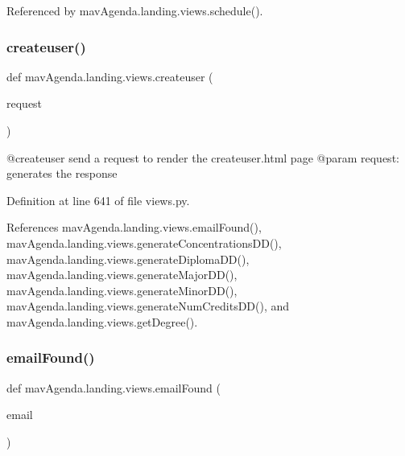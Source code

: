 Referenced by mav\+Agenda.\+landing.\+views.\+schedule().

\mbox{\label{namespacemavAgenda_1_1landing_1_1views_aa998c2a3a45470fbe34a8d653246f471}} 
\subsubsection{\texorpdfstring{createuser()}{createuser()}}
{\footnotesize\ttfamily def mav\+Agenda.\+landing.\+views.\+createuser (\begin{DoxyParamCaption}\item[{}]{request }\end{DoxyParamCaption})}

\begin{DoxyVerb}@createuser send a request to render the createuser.html page
@param request: generates the response
\end{DoxyVerb}
 

Definition at line 641 of file views.\+py.



References mav\+Agenda.\+landing.\+views.\+email\+Found(), mav\+Agenda.\+landing.\+views.\+generate\+Concentrations\+D\+D(), mav\+Agenda.\+landing.\+views.\+generate\+Diploma\+D\+D(), mav\+Agenda.\+landing.\+views.\+generate\+Major\+D\+D(), mav\+Agenda.\+landing.\+views.\+generate\+Minor\+D\+D(), mav\+Agenda.\+landing.\+views.\+generate\+Num\+Credits\+D\+D(), and mav\+Agenda.\+landing.\+views.\+get\+Degree().

\mbox{\label{namespacemavAgenda_1_1landing_1_1views_a6a9fc857408512125072955d505bf8f3}} 
\subsubsection{\texorpdfstring{email\+Found()}{emailFound()}}
{\footnotesize\ttfamily def mav\+Agenda.\+landing.\+views.\+email\+Found (\begin{DoxyParamCaption}\item[{}]{email }\end{DoxyParamCaption})}

